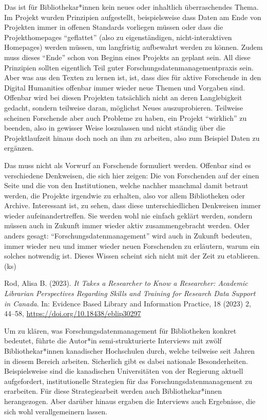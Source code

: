 \documentclass[a4paper,
fontsize=11pt,
oneside,
numbers=noperiodatend,
parskip=half-,
bibliography=totoc,
final
]{scrartcl}
\begin{document}
Das ist für Bibliothekar*innen kein neues oder inhaltlich überraschendes
Thema. Im Projekt wurden Prinzipien aufgestellt, beispielsweise dass
Daten am Ende von Projekten immer in offenen Standards vorliegen müssen
oder dass die Projekthomepages \enquote{geflattet} (also zu
eigenständigen, nicht-interaktiven Homepages) werden müssen, um
langfristig aufbewahrt werden zu können. Zudem muss dieses
\enquote{Ende} schon von Beginn eines Projekts an geplant sein. All
diese Prinzipien sollten eigentlich Teil guter
Forschungsdatenmanagementpraxis sein. Aber was aus den Texten zu lernen
ist, ist, dass dies für aktive Forschende in den Digital Humanities
offenbar immer wieder neue Themen und Vorgaben sind. Offenbar wird bei
diesen Projekten tatsächlich nicht an deren Langlebigkeit gedacht,
sondern teilweise daran, möglichst Neues auszuprobieren. Teilweise
scheinen Forschende aber auch Probleme zu haben, ein Projekt
\enquote{wirklich} zu beenden, also in gewisser Weise loszulassen und
nicht ständig über die Projektlaufzeit hinaus doch noch an ihm zu
arbeiten, also zum Beispiel Daten zu ergänzen.

Das muss nicht als Vorwurf an Forschende formuliert werden. Offenbar
sind es verschiedene Denkweisen, die sich hier zeigen: Die von
Forschenden auf der einen Seite und die von den Institutionen, welche
nachher manchmal damit betraut werden, die Projekte irgendwie zu
erhalten, also vor allem Bibliotheken oder Archive. Interessant ist, zu
sehen, dass diese unterschiedlichen Denkweisen immer wieder
aufeinandertreffen. Sie werden wohl nie einfach geklärt werden, sondern
müssen auch in Zukunft immer wieder aktiv zusammengebracht werden. Oder
anders gesagt: \enquote{Forschungsdatenmanagement} wird auch in Zukunft
bedeuten, immer wieder neu und immer wieder neuen Forschenden zu
erläutern, warum ein solches notwendig ist. Dieses Wissen scheint sich
nicht mit der Zeit zu etablieren. (ks)

Rod, Alisa B. (2023). \emph{It Takes a Researcher to Know a Researcher:
Academic Librarian Perspectives Regarding Skills and Training for
Research Data Support in Canada}. In: Evidence Based Library and
Information Practice, 18 (2023) 2, 44--58,
\url{https://doi.org/10.18438/eblip30297}

Um zu klären, was Forschungsdatenmanagement für Bibliotheken konkret
bedeutet, führte die Autor*in semi-strukturierte Interviews mit zwölf
Bibliothekar*innen kanadischer Hochschulen durch, welche teilweise seit
Jahren in diesem Bereich arbeiten. Sicherlich gibt es dabei nationale
Besonderheiten. Beispielsweise sind die kanadischen Universitäten von
der Regierung aktuell aufgefordert, institutionelle Strategien für das
Forschungsdatenmanagement zu erarbeiten. Für diese Strategiearbeit
werden auch Bibliothekar*innen herangezogen. Aber darüber hinaus ergaben
die Interviews auch Ergebnisse, die sich wohl verallgemeinern lassen.
\end{document}
